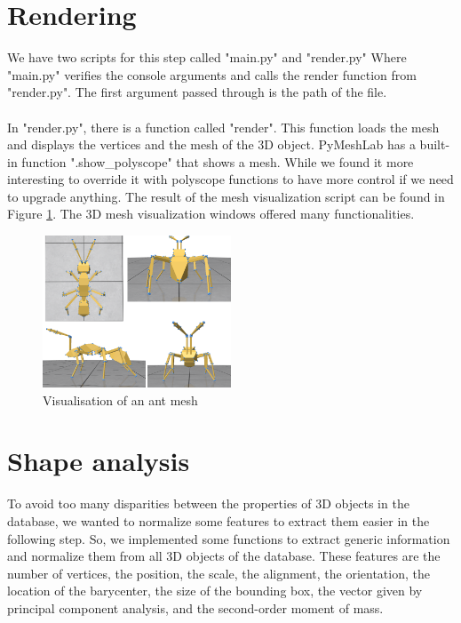 \documentclass[10pt,twocolumn,letterpaper]{article}
\begin{document}
\section{Rendering}
We have two scripts for this step called "main.py" and "render.py" Where "main.py" verifies the console arguments and calls the render function from "render.py". The first argument passed through is the path of the file. \\ \\
In "render.py", there is a function called "render". This function loads the mesh and displays the vertices and the mesh of the 3D object. PyMeshLab has a built-in function ".show\_polyscope" that shows a mesh. While we found it more interesting to override it with polyscope functions to have more control if we need to upgrade anything. The result of the mesh visualization script can be found in Figure \ref{fig:ant-mesh}. The 3D mesh visualization windows offered many functionalities.

\begin{figure}[h!]
\begin{center}
  \includegraphics[width=0.5\textwidth]{picture/ant}
  \caption{Visualisation of an ant mesh}
  \label{fig:ant-mesh}
  \end{center}
\end{figure}

\section{Shape analysis}
To avoid too many disparities between the properties of 3D objects in the database, we wanted to normalize some features to extract them easier in the following step. So, we implemented some functions to extract generic information and normalize them from all 3D objects of the database. These features are the number of vertices, the position, the scale, the alignment, the orientation, the location of the barycenter, the size of the bounding box, the vector given by principal component analysis, and the second-order moment of mass.
\end{document}
